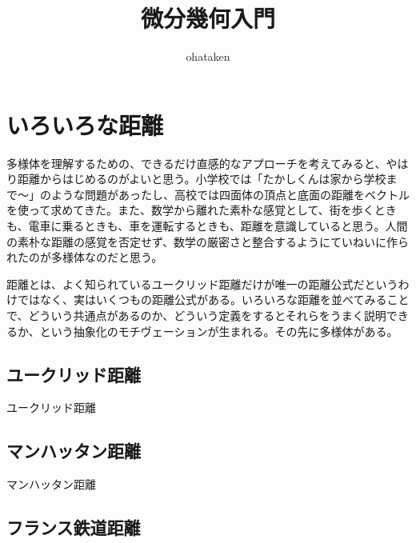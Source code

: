 \title{\huge 微分幾何入門}
\author{ohataken}
\maketitle

\newpage


\section{いろいろな距離}

多様体を理解するための、できるだけ直感的なアプローチを考えてみると、やはり距離からはじめるのがよいと思う。小学校では「たかしくんは家から学校まで〜」のような問題があったし、高校では四面体の頂点と底面の距離をベクトルを使って求めてきた。また、数学から離れた素朴な感覚として、街を歩くときも、電車に乗るときも、車を運転するときも、距離を意識していると思う。人間の素朴な距離の感覚を否定せず、数学の厳密さと整合するようにていねいに作られたのが多様体なのだと思う。

距離とは、よく知られているユークリッド距離だけが唯一の距離公式だというわけではなく、実はいくつもの距離公式がある。いろいろな距離を並べてみることで、どういう共通点があるのか、どういう定義をするとそれらをうまく説明できるか、という抽象化のモチヴェーションが生まれる。その先に多様体がある。

\newpage


\subsection{ユークリッド距離}

ユークリッド距離

\newpage


\subsection{マンハッタン距離}

マンハッタン距離

\newpage


\subsection{フランス鉄道距離}

